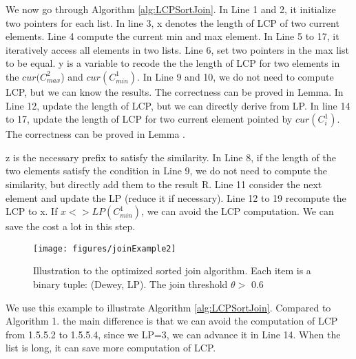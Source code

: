  We now go through Algorithm \ref{alg:LCPSortJoin}. In Line 1 and 2, it initialize two pointers for each list. In line 3, x denotes the length of LCP of two current elements. Line 4 compute the current min and max element. In Line 5 to 17, it iteratively access all elements in two lists. Line 6, set two pointers in the max list to be equal. y is a variable to recode the the length of LCP for two elements in the  $cur(C_{max}^2$) and $cur(C_{min}^1)$. In Line 9 and 10, we do not need to compute LCP, but we can know the results. The correctness can be proved in Lemma. In Line 12, update the length of LCP, but we can directly derive from LP. In line 14 to 17, update the length of LCP for two current element pointed by  $cur(C_{i}^1)$. The correctness can be proved in Lemma .
 
 z is the necessary prefix to satisfy the similarity. In Line 8, if the length of the two elements satisfy the condition in Line 9, we do not need to compute the similarity, but directly add them to the result R. Line 11 consider the next element and update the LP (reduce it if necessary). Line 12 to 19 recompute the LCP to x. If $x <> LP(C_{min}^1)$, we can avoid the LCP computation. We can save the cost a lot in this step.  

%
%


\begin{figure}[t]
\centering
\texttt{[image: figures/joinExample2]}
 \caption{Illustration to the optimized sorted join algorithm. Each item is a binary tuple: (Dewey, LP). The join threshold $\theta >$ 0.6 }
\label{fig:sortJoin}
\end{figure}

\begin{example} We use this example to illustrate Algorithm \ref{alg:LCPSortJoin}. Compared to Algorithm 1. the main difference is that we can avoid the computation of LCP from 1.5.5.2 to 1.5.5.4, since we LP=3, we can advance it in Line 14. When the list is long, it can save more computation of LCP. 
\end{example}

